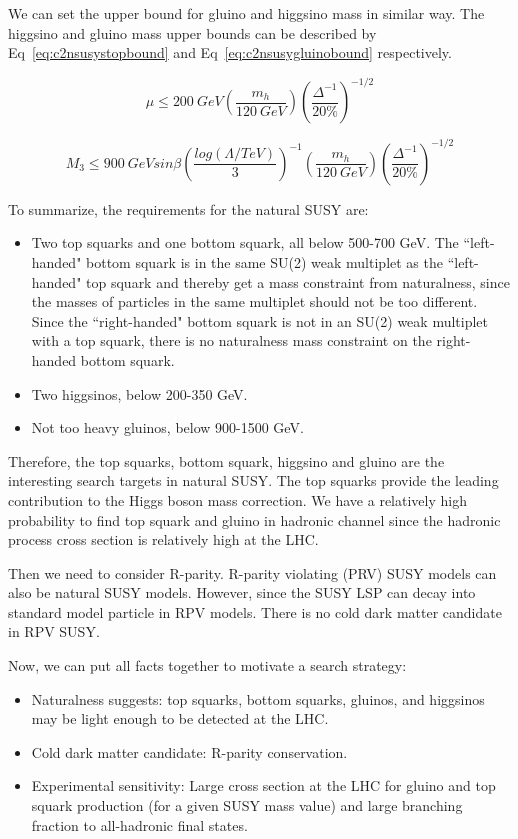 We can set the upper bound for gluino and higgsino mass in similar way\cite{Papucci:2011wy}. The higgsino and gluino mass upper bounds can be described by Eq~\ref{eq:c2nsusystopbound} and Eq~\ref{eq:c2nsusygluinobound} respectively.

\begin{equation}
 \mu \leq 200~GeV (\frac{m_{h}}{120~GeV})(\frac{\Delta^{-1}}{20\%})^{-1/2}
 \label{eq:c2nsusyhiggsinobound}
\end{equation}

\begin{equation}
 M_{3} \leq 900~GeV sin\beta (\frac{log(\Lambda/TeV)}{3})^{-1}(\frac{m_{h}}{120~GeV})(\frac{\Delta^{-1}}{20\%})^{-1/2}
 \label{eq:c2nsusygluinobound}
\end{equation}

To summarize, the requirements for the natural SUSY are:
\begin{itemize}
\item Two top squarks and one bottom squark, all below 500-700 GeV. 
The ``left-handed" bottom squark is in the same SU(2)
weak multiplet as the ``left-handed" top squark and
thereby get a mass constraint from naturalness,
since the masses of particles in the same multiplet
should not be too different. Since the ``right-handed"
bottom squark is not in an SU(2) weak multiplet with a
top squark, there is no naturalness mass constraint on
the right-handed bottom squark.
\item Two higgsinos, below 200-350 GeV.
\item Not too heavy gluinos, below 900-1500 GeV.
\end{itemize}

Therefore, the top squarks, bottom squark, higgsino and gluino are the interesting search targets in natural SUSY. The top squarks provide the leading contribution to the Higgs boson mass correction. We have a relatively high probability to find top squark and gluino in hadronic channel since the hadronic process cross section is relatively high at the LHC. 

Then we need to consider R-parity. R-parity violating (PRV) SUSY models can also be natural SUSY models. However, since the SUSY LSP can decay into standard model particle in RPV models. There is no cold dark matter candidate in RPV SUSY. 

Now, we can put all facts together to motivate a search strategy: 
\begin{itemize}
\item Naturalness suggests: top squarks, bottom squarks, gluinos, and higgsinos may be light enough to be detected at the LHC.
\item Cold dark matter candidate: R-parity conservation.
\item Experimental sensitivity: Large cross section at the LHC for gluino and top squark production (for a given SUSY mass value) and large branching fraction to all-hadronic final states.
\end{itemize}

